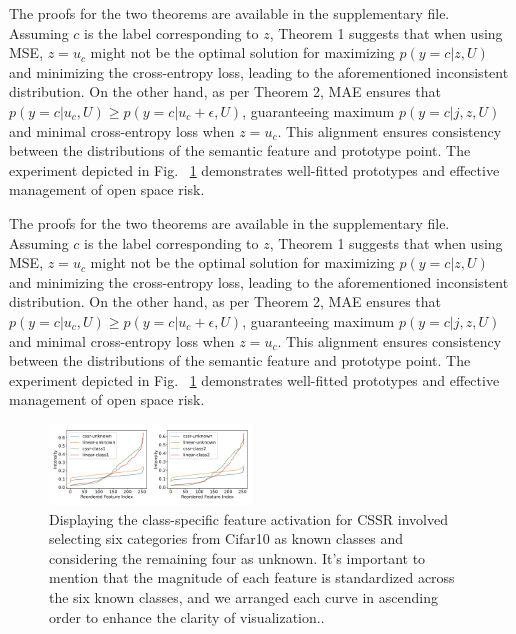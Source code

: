 \documentclass{gji}
\begin{document}
The proofs for the two theorems are available in the supplementary file. Assuming $c$ is the label corresponding to $z$, Theorem 1 suggests that when using MSE, $z = u_c$ might not be the optimal solution for maximizing $p(y = c|z, U)$ and minimizing the cross-entropy loss, leading to the aforementioned inconsistent distribution. On the other hand, as per Theorem 2, MAE ensures that $p(y = c|u_c, U) \geq p(y = c|u_c + \epsilon, U)$, guaranteeing maximum $p(y = c|j,z, U)$ and minimal cross-entropy loss when $z = u_c$. This alignment ensures consistency between the distributions of the semantic feature and prototype point. The experiment depicted in Fig. ~\ref{fig3} demonstrates well-fitted prototypes and effective management of open space risk.

The proofs for the two theorems are available in the supplementary file. Assuming $c$ is the label corresponding to $z$, Theorem 1 suggests that when using MSE, $z = u_c$ might not be the optimal solution for maximizing $p(y = c|z, U)$ and minimizing the cross-entropy loss, leading to the aforementioned inconsistent distribution. On the other hand, as per Theorem 2, MAE ensures that $p(y = c|u_c, U) \geq p(y = c|u_c + \epsilon, U)$, guaranteeing maximum $p(y = c|j,z, U)$ and minimal cross-entropy loss when $z = u_c$. This alignment ensures consistency between the distributions of the semantic feature and prototype point. The experiment depicted in Fig. ~\ref{fig3} demonstrates well-fitted prototypes and effective management of open space risk.

\begin{figure}  
\centering
  \includegraphics[width=0.48\textwidth]{fig4.png}
     \caption{Displaying the class-specific feature activation for CSSR involved selecting six categories from Cifar10 as known classes and considering the remaining four as unknown. It's important to mention that the magnitude of each feature is standardized across the six known classes, and we arranged each curve in ascending order to enhance the clarity of visualization..
} \label{fig3}
    
  \end{figure}
\end{document}
